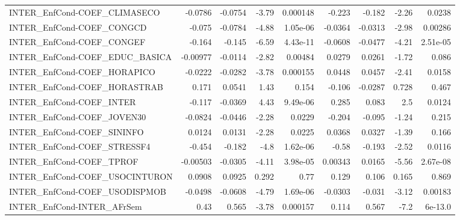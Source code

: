 \begin{tabular}{lrrrrrrrr}
INTER\_EnfCond-COEF\_CLIMASECO          &     -0.0786 &      -0.0754 &   -3.79 & 0.000148 &     -0.223 &      -0.182 &        -2.26 &        0.0238 \\
INTER\_EnfCond-COEF\_CONGCD             &      -0.075 &      -0.0784 &   -4.88 & 1.05e-06 &    -0.0364 &     -0.0313 &        -2.98 &       0.00286 \\
INTER\_EnfCond-COEF\_CONGEF             &      -0.164 &       -0.145 &   -6.59 & 4.43e-11 &    -0.0608 &     -0.0477 &        -4.21 &      2.51e-05 \\
INTER\_EnfCond-COEF\_EDUC\_BASICA        &    -0.00977 &      -0.0114 &   -2.82 &  0.00484 &     0.0279 &      0.0261 &        -1.72 &         0.086 \\
INTER\_EnfCond-COEF\_HORAPICO           &     -0.0222 &      -0.0282 &   -3.78 & 0.000155 &     0.0448 &      0.0457 &        -2.41 &        0.0158 \\
INTER\_EnfCond-COEF\_HORASTRAB          &       0.171 &       0.0541 &    1.43 &    0.154 &     -0.106 &     -0.0287 &        0.728 &         0.467 \\
INTER\_EnfCond-COEF\_INTER              &      -0.117 &      -0.0369 &    4.43 & 9.49e-06 &      0.285 &       0.083 &          2.5 &        0.0124 \\
INTER\_EnfCond-COEF\_JOVEN30            &     -0.0824 &      -0.0446 &   -2.28 &   0.0229 &     -0.204 &      -0.095 &        -1.24 &         0.215 \\
INTER\_EnfCond-COEF\_SININFO            &      0.0124 &       0.0131 &   -2.28 &   0.0225 &     0.0368 &      0.0327 &        -1.39 &         0.166 \\
INTER\_EnfCond-COEF\_STRESSF4           &      -0.454 &       -0.182 &    -4.8 & 1.62e-06 &      -0.58 &      -0.193 &        -2.52 &        0.0116 \\
INTER\_EnfCond-COEF\_TPROF              &    -0.00503 &      -0.0305 &   -4.11 & 3.98e-05 &    0.00343 &      0.0165 &        -5.56 &      2.67e-08 \\
INTER\_EnfCond-COEF\_USOCINTURON        &      0.0908 &       0.0925 &   0.292 &     0.77 &      0.129 &       0.106 &        0.165 &         0.869 \\
INTER\_EnfCond-COEF\_USODISPMOB         &     -0.0498 &      -0.0608 &   -4.79 & 1.69e-06 &    -0.0303 &      -0.031 &        -3.12 &       0.00183 \\
INTER\_EnfCond-INTER\_AFrSem            &        0.43 &        0.565 &   -3.78 & 0.000157 &      0.114 &       0.567 &         -7.2 &       6e-13.0 \\

\end{tabular}
